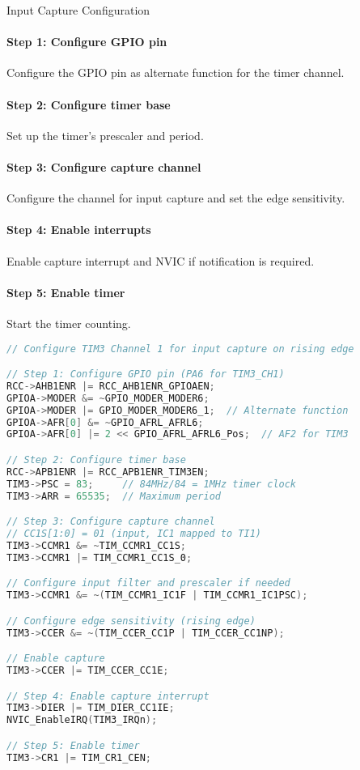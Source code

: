 \begin{KR}{Input Capture Configuration}
\paragraph{Step 1: Configure GPIO pin}
Configure the GPIO pin as alternate function for the timer channel.
\paragraph{Step 2: Configure timer base}
Set up the timer's prescaler and period.
\paragraph{Step 3: Configure capture channel}
Configure the channel for input capture and set the edge sensitivity.
\paragraph{Step 4: Enable interrupts}
Enable capture interrupt and NVIC if notification is required.
\paragraph{Step 5: Enable timer}
Start the timer counting.

\begin{lstlisting}[language=C, style=basesmol]
// Configure TIM3 Channel 1 for input capture on rising edge

// Step 1: Configure GPIO pin (PA6 for TIM3_CH1)
RCC->AHB1ENR |= RCC_AHB1ENR_GPIOAEN;
GPIOA->MODER &= ~GPIO_MODER_MODER6;
GPIOA->MODER |= GPIO_MODER_MODER6_1;  // Alternate function
GPIOA->AFR[0] &= ~GPIO_AFRL_AFRL6;
GPIOA->AFR[0] |= 2 << GPIO_AFRL_AFRL6_Pos;  // AF2 for TIM3

// Step 2: Configure timer base
RCC->APB1ENR |= RCC_APB1ENR_TIM3EN;
TIM3->PSC = 83;     // 84MHz/84 = 1MHz timer clock
TIM3->ARR = 65535;  // Maximum period

// Step 3: Configure capture channel
// CC1S[1:0] = 01 (input, IC1 mapped to TI1)
TIM3->CCMR1 &= ~TIM_CCMR1_CC1S;
TIM3->CCMR1 |= TIM_CCMR1_CC1S_0;

// Configure input filter and prescaler if needed
TIM3->CCMR1 &= ~(TIM_CCMR1_IC1F | TIM_CCMR1_IC1PSC);

// Configure edge sensitivity (rising edge)
TIM3->CCER &= ~(TIM_CCER_CC1P | TIM_CCER_CC1NP);

// Enable capture
TIM3->CCER |= TIM_CCER_CC1E;

// Step 4: Enable capture interrupt
TIM3->DIER |= TIM_DIER_CC1IE;
NVIC_EnableIRQ(TIM3_IRQn);

// Step 5: Enable timer
TIM3->CR1 |= TIM_CR1_CEN;
\end{lstlisting}
\end{KR}

